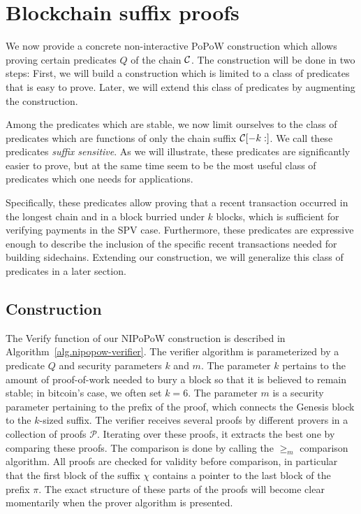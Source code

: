 \section{Blockchain suffix proofs}

We now provide a concrete non-interactive PoPoW construction which allows
proving certain predicates $Q$ of the chain $\mathcal{C}$. The construction will
be done in two steps: First, we will build a construction which is limited to
a class of predicates that is easy to prove. Later, we will extend this class
of predicates by augmenting the construction.

Among the predicates which are stable, we now limit ourselves to the class of
predicates which are functions of only the chain suffix $\mathcal{C}[-k:]$. We call
these predicates \textit{suffix sensitive}. As we will illustrate, these
predicates are significantly easier to prove, but at the same time seem to be
the most useful class of predicates which one needs for applications.

Specifically, these predicates allow proving that a recent transaction occurred
in the longest chain and in a block burried under $k$ blocks, which is
sufficient for verifying payments in the SPV case. Furthermore, these
predicates are expressive enough to describe the inclusion of the specific
recent transactions needed for building sidechains. Extending our construction,
we will generalize this class of predicates in a later section.

\subsection{Construction}

The \textsf{Verify} function of our NIPoPoW construction is described in
Algorithm~\ref{alg.nipopow-verifier}. The verifier algorithm is parameterized
by a predicate $Q$ and security parameters $k$ and $m$. The parameter $k$
pertains to the amount of proof-of-work needed to bury a block so that it is
believed to remain stable; in bitcoin's case, we often set $k = 6$. The
parameter $m$ is a security parameter pertaining to the prefix of the proof,
which connects the Genesis block to the $k$-sized suffix.  The verifier
receives several proofs by different provers in a collection of proofs
$\mathcal{P}$. Iterating over these proofs, it extracts the best one by
comparing these proofs. The comparison is done by calling the $\geq_m$
comparison algorithm. All proofs are checked for validity before comparison, in
particular that the first block of the suffix $\chi$ contains a pointer to the
last block of the prefix $\pi$. The exact structure of these parts of the
proofs will become clear momentarily when the prover algorithm is presented.

